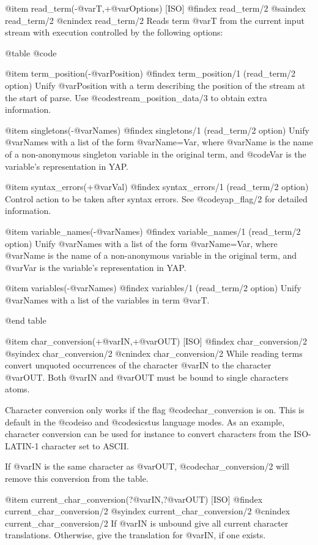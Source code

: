{{{{{{@item read_term(-@var{T},+@var{Options}) [ISO]
@findex read_term/2
@saindex read_term/2
@cnindex read_term/2
Reads term @var{T} from the current input stream with execution
controlled by the following options:

@table @code

@item  term_position(-@var{Position})
@findex term_position/1 (read_term/2 option)
Unify @var{Position} with a term describing the position of the stream
at the start of parse. Use @code{stream_position_data/3} to obtain extra
information.

@item  singletons(-@var{Names})
@findex singletons/1 (read_term/2 option)
Unify @var{Names} with a list of the form @var{Name=Var}, where
@var{Name} is the name of a non-anonymous singleton variable in the
original term, and @code{Var} is the variable's representation in
YAP.

@item  syntax_errors(+@var{Val})
@findex syntax_errors/1 (read_term/2 option)
Control action to be taken after syntax errors. See @code{yap_flag/2}
for detailed information.

@item  variable_names(-@var{Names})
@findex variable_names/1 (read_term/2 option)
Unify @var{Names} with a list of the form @var{Name=Var}, where @var{Name} is
the name of a non-anonymous variable in the original term, and @var{Var}
is the variable's representation in YAP.

@item  variables(-@var{Names})
@findex variables/1 (read_term/2 option)
Unify @var{Names} with a list of the variables in term @var{T}.

@end table

@item char_conversion(+@var{IN},+@var{OUT}) [ISO]
@findex char_conversion/2
@syindex char_conversion/2
@cnindex char_conversion/2
While reading terms convert unquoted occurrences of the character
@var{IN} to the character @var{OUT}. Both @var{IN} and @var{OUT} must be
bound to single characters atoms.

Character conversion only works if the flag @code{char_conversion} is
on. This is default in the @code{iso} and @code{sicstus} language
modes. As an example, character conversion can be used for instance to
convert characters from the ISO-LATIN-1 character set to ASCII.

If @var{IN} is the same character as @var{OUT}, @code{char_conversion/2}
will remove this conversion from the table.

@item current_char_conversion(?@var{IN},?@var{OUT}) [ISO]
@findex current_char_conversion/2
@syindex current_char_conversion/2
@cnindex current_char_conversion/2
If @var{IN} is unbound give all current character
translations. Otherwise, give the translation for @var{IN}, if one
exists.

}}}}}}
